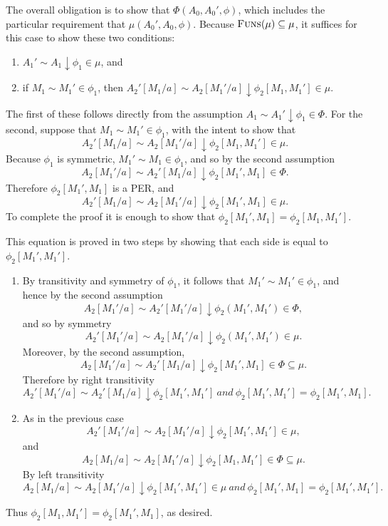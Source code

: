 \documentclass[11pt,twoside]{article}
\begin{document}
The overall obligation is to show that $\Phi(A_{0},A_{0}',\phi)$, which includes the particular
requirement that $\mu(A_{0}',A_{0},\phi)$.  Because $\textsc{Funs}(\mu)\subseteq\mu$, it suffices for this
case to show these two conditions:
\begin{enumerate}
\item $A_{1}'\sim A_{1}\downarrow\phi_{1}\in\mu$, and
\item if $M_1\sim M_1'\in\phi_{1}$, then $A_{2}'[M_1/a]\sim A_{2}[M_1'/a]\downarrow\phi_{2}[M_1,M_1']\in\mu$.
\end{enumerate}
The first of these follows directly from the assumption
$A_{1}\sim A_{1}'\downarrow\phi_{1}\in\Phi$.  For the second, suppose that
$M_1\sim M_1'\in\phi_{1}$, with the intent to show that
$$A_{2}'[M_1/a]\sim A_{2}[M_1'/a]\downarrow \phi_{2}[M_1,M_1']\in\mu.$$  Because $\phi_{1}$ is symmetric,
$M_1'\sim M_1\in\phi_{1}$, and so by the second assumption
$$A_{2}[M_1'/a] \sim A_{2}'[M_1/a]\downarrow\phi_{2}[M_1',M_1]\in\Phi.$$  Therefore $\phi_{2}[M_1',M_1]$ is a
PER, and
$$A_{2}'[M_1/a]\sim A_{2}[M_1'/a]\downarrow\phi_{2}[M_1',M_1]\in\mu.$$  To complete the proof it is
enough to show that $\phi_{2}[M_1',M_1]=\phi_{2}[M_1,M_1']$.

This equation is proved in two steps by showing that each side is equal to
$\phi_{2}[M_{1}',M_{1}']$.
\begin{enumerate}
\item By transitivity and symmetry of $\phi_{1}$, it follows that $M_{1}'\sim M_{1}'\in\phi_{1}$, and
  hence by the second assumption $$A_{2}[M_{1}'/a]\sim
  A_{2}'[M_{1}'/a]\downarrow\phi_{2}(M_{1}',M_{1}')\in\Phi,$$ and so by symmetry
  $$A_{2}'[M_{1}'/a]\sim A_{2}[M_{1}'/a]\downarrow\phi_{2}(M_{1}',M_{1}')\in\mu.$$
  Moreover, by the second assumption, $$A_{2}[M_{1}'/a] \sim
  A_{2}'[M_{1}/a]\downarrow\phi_{2}[M_{1}',M_{1}]\in\Phi\subseteq\mu.$$
  Therefore by right transitivity
  $$A_{2}'[M_{1}'/a]\sim A_{2}'[M_{1}/a]\downarrow\phi_{2}[M_{1}',M_{1}']\ \textit{and}\ \phi_{2}[M_{1}',M_{1}']=\phi_{2}[M_{1}',M_{1}].$$
\item As in the previous case $$A_{2}'[M_{1}'/a] \sim A_{2}[M_{1}'/a] \downarrow \phi_{2}[M_{1}',M_{1}']\in\mu,$$
  and $$A_{2}[M_{1}/a]\sim A_{2}[M_{1}'/a]\downarrow\phi_{2}[M_{1},M_{1}']\in\Phi\subseteq\mu.$$
  By left transitivity
  $$A_{2}[M_{1}/a] \sim A_{2}[M_{1}'/a] \downarrow \phi_{2}[M_{1}',M_{1}']\in\mu\ \textit{and}\
  \phi_2[M_1',M_1]=\phi_2[M_1',M_1'].$$
\end{enumerate}
Thus $\phi_{2}[M_{1},M_{1}']=\phi_{2}[M_{1}',M_{1}]$, as desired.
\end{document}
